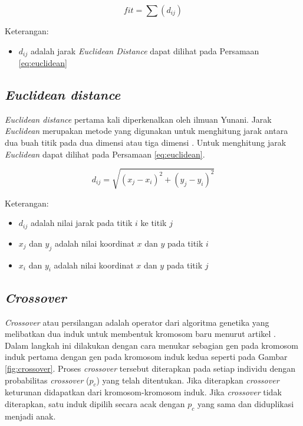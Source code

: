 	\begin{equation}
    fit=\sum (d_{ij})
    \label{eq:fitness}
    \end{equation}
    
    Keterangan:
    \begin{itemize}
	\item $d_{ij}$ adalah jarak \textit{Euclidean Distance} dapat dilihat pada Persamaan \ref{eq:euclidean}
    \end{itemize}
	
\subsection{\textit{Euclidean distance}}

\textit{Euclidean distance} pertama kali diperkenalkan oleh ilmuan Yunani. Jarak \textit{Euclidean} merupakan metode yang digunakan untuk menghitung jarak antara dua buah titik pada dua dimensi atau tiga dimensi \cite{widodo2018penerapan}. Untuk menghitung jarak \textit{Euclidean} dapat dilihat pada Persamaan \ref{eq:euclidean}.
       
    \begin{equation}
	d_{ij}=\sqrt{\left( x_j-x_i \right)^{2}+\left( y_j-y_i \right)^{2}}
	\label{eq:euclidean}
	\end{equation}
	
	Keterangan:
	\begin{itemize}
	\item $d_{ij}$ adalah nilai jarak pada titik $i$ ke titik $j$
	\item $x_j$ dan $y_j$ adalah nilai koordinat $x$ dan $y$ pada titik $i$
	\item $x_i$ dan $y_i$ adalah nilai koordinat $x$ dan $y$ pada titik $j$
	\end{itemize}

\subsection{\textit{Crossover}}
\textit{Crossover} atau persilangan adalah operator dari algoritma genetika yang melibatkan dua induk untuk membentuk kromosom baru menurut artikel \cite{hardi2014analisis}. Dalam langkah ini dilakukan dengan cara menukar sebagian gen pada kromosom induk pertama dengan gen pada kromosom induk kedua seperti pada Gambar \ref{fig:crossover}. Proses \textit{crossover} tersebut diterapkan pada setiap individu dengan probabilitas \textit{crossover} ($p_c$) yang telah ditentukan. Jika diterapkan \textit{crossover} keturunan didapatkan dari kromosom-kromosom induk. Jika \textit{crossover} tidak diterapkan, satu induk dipilih secara acak dengan $p_c$ yang sama dan diduplikasi menjadi anak.

